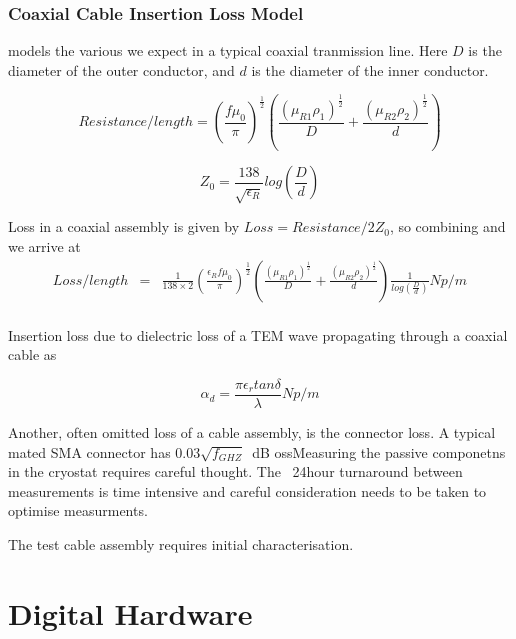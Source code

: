 \subsubsection{Coaxial Cable Insertion Loss Model}

 models the various we expect in a typical coaxial tranmission line. Here $D$ is the diameter of the outer conductor, and $d$ is the diameter of the inner conductor.

\begin{equation}
 Resistance/length=\left ( \frac{f\mu_{0}}{\pi} \right ) ^{\frac{1}{2}}  \left ( \frac{(\mu_{R1}\rho_{1})^{\frac{1}{2}}}{D} + \frac{(\mu_{R2}\rho_{2})^{\frac{1}{2}}}{d}\right ) 
\label{eq:resistance_length}
\end{equation}

\begin{equation}
 Z_{0}=\frac{138}{\sqrt{\epsilon_{R}}}log \left (\frac{D}{d} \right )
\label{eq:impedance}
\end{equation}

Loss in a coaxial assembly is given by $Loss=Resistance/2Z_{0}$, so combining  and  we arrive at
\begin{eqnarray}
 Loss/length&=&\frac{1}{138 \times 2}\left ( \frac{\epsilon_{R}f\mu_{0}}{\pi} \right ) ^{\frac{1}{2}}  \left ( \frac{(\mu_{R1}\rho_{1})^{\frac{1}{2}}}{D} + \frac{(\mu_{R2}\rho_{2})^{\frac{1}{2}}}{d}\right ) \frac{1}{log\left ( \frac{D}{d} \right )} Np/m\\
\end{eqnarray}

Insertion loss due to dielectric loss of a TEM wave propagating through a coaxial cable as

\begin{equation}
 \alpha_{d}=\frac{\pi \epsilon_{r} tan \delta}{\lambda} Np/m
\label{eq:dielectric_attenuation}
\end{equation}

Another, often omitted loss of a cable assembly, is the connector loss. A typical mated SMA connector has $0.03\sqrt{f_{GHZ}}$~dB ossMeasuring the passive componetns in the cryostat requires careful thought. The ~24hour turnaround between measurements is time intensive and careful consideration needs to be taken to optimise measurments.

The test cable assembly requires initial characterisation. 


\clearpage

\section{Digital Hardware}

